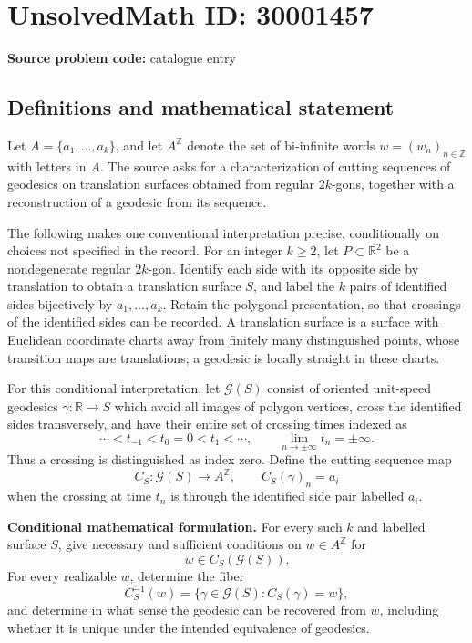 \documentclass[11pt]{article}
\newcommand{\Z}{\mathbb{Z}}
\newcommand{\R}{\mathbb{R}}
\begin{document}
\section*{UnsolvedMath ID: 30001457}
\textbf{Source problem code:} catalogue entry
\subsection{Definitions and mathematical statement}
Let \(A=\{a_1,\ldots,a_k\}\), and let \(A^{\Z}\) denote the set of bi-infinite words \(w=(w_n)_{n\in\Z}\) with letters in \(A\). The source asks for a characterization of cutting sequences of geodesics on translation surfaces obtained from regular \(2k\)-gons, together with a reconstruction of a geodesic from its sequence.

The following makes one conventional interpretation precise, conditionally on choices not specified in the record. For an integer \(k\geq 2\), let \(P\subset\R^2\) be a nondegenerate regular \(2k\)-gon. Identify each side with its opposite side by translation to obtain a translation surface \(S\), and label the \(k\) pairs of identified sides bijectively by \(a_1,\ldots,a_k\). Retain the polygonal presentation, so that crossings of the identified sides can be recorded. A translation surface is a surface with Euclidean coordinate charts away from finitely many distinguished points, whose transition maps are translations; a geodesic is locally straight in these charts.

For this conditional interpretation, let \(\mathcal G(S)\) consist of oriented unit-speed geodesics \(\gamma:\R\to S\) which avoid all images of polygon vertices, cross the identified sides transversely, and have their entire set of crossing times indexed as
\[
\cdots<t_{-1}<t_0=0<t_1<\cdots,
\qquad \lim_{n\to\pm\infty}t_n=\pm\infty.
\]
Thus a crossing is distinguished as index zero. Define the cutting sequence map
\[
C_S:\mathcal G(S)\longrightarrow A^{\Z},\qquad
C_S(\gamma)_n=a_i
\]
when the crossing at time \(t_n\) is through the identified side pair labelled \(a_i\).

\textbf{Conditional mathematical formulation.} For every such \(k\) and labelled surface \(S\), give necessary and sufficient conditions on \(w\in A^{\Z}\) for
\[
w\in C_S(\mathcal G(S)).
\]
For every realizable \(w\), determine the fiber
\[
C_S^{-1}(w)=\{\gamma\in\mathcal G(S):C_S(\gamma)=w\},
\]
and determine in what sense the geodesic can be recovered from \(w\), including whether it is unique under the intended equivalence of geodesics.
\end{document}
